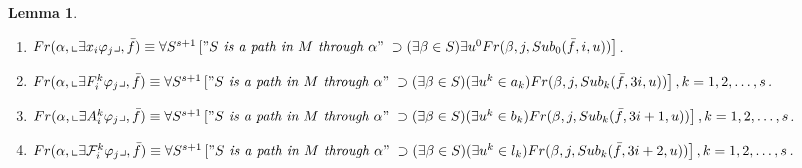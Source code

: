 \documentclass{asl}
\newtheorem{lemma}{Lemma}[section]
\theoremstyle{definition}
\begin{document}
\begin{lemma}
\begin{enumerate}
\item $Fr(\alpha,\llcorner \exists x_i \varphi_j \lrcorner,\bar{f}) \equiv 
\forall S^{s+1}\left["S\textit{ is a path in }M\textit{ through }\alpha" 
\right.
\medskip
\\
\left.
\supset(\exists\beta\in S)\exists u^0 Fr(\beta,j,Sub_0(\bar{f},i,u))\right] $.
\medskip

\item $Fr(\alpha,\llcorner \exists F_i^k \varphi_j \lrcorner,\bar{f}) \equiv 
\forall S^{s+1}\left["S\textit{ is a path in }M\textit{ through }\alpha" 
\right.
\medskip
\\
\left.
\supset(\exists\beta\in S)(\exists u^k\in a_k) Fr(\beta,j,Sub_k(\bar{f},3i,u))\right],
k=1,2,\ldots,s $.
\medskip

\item $Fr(\alpha,\llcorner \exists A_i^k \varphi_j \lrcorner,\bar{f}) \equiv 
\forall S^{s+1}\left["S\textit{ is a path in }M\textit{ through }\alpha" 
\right.
\medskip
\\
\left.
\supset(\exists\beta\in S)(\exists u^k\in b_k) Fr(\beta,j,Sub_k(\bar{f},3i+1,u))\right],
k=1,2,\ldots,s $.
\medskip

\item $Fr(\alpha,\llcorner \exists \mathcal{F}_i^k \varphi_j \lrcorner,\bar{f}) \equiv 
\forall S^{s+1}\left["S\textit{ is a path in }M\textit{ through }\alpha" 
\right.
\medskip
\\
\left.
\supset(\exists\beta\in S)(\exists u^k\in l_k) Fr(\beta,j,Sub_k(\bar{f},3i+2,u))\right],
k=1,2,\ldots,s $.
\end{enumerate}
\label{lemma:force8}
\end{lemma}
\end{document}
